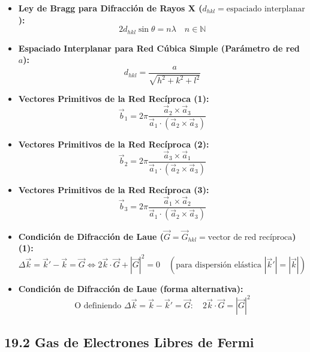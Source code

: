 \documentclass[11pt,a4paper]{article}
\begin{document}
\begin{itemize}
  \item \textbf{Ley de Bragg para Difracción de Rayos X ($d_{hkl} = \text{espaciado interplanar}$):}
  \[
    2 d_{hkl} \sin\theta = n \lambda \quad n \in \mathbb{N}
  \]
  \item \textbf{Espaciado Interplanar para Red Cúbica Simple (Parámetro de red $a$):}
  \[
    d_{hkl} = \frac{a}{\sqrt{h^2 + k^2 + l^2}}
  \]
  \item \textbf{Vectores Primitivos de la Red Recíproca (1):}
  \[
    \vec{b}_1 = 2\pi \frac{\vec{a}_2 \times \vec{a}_3}{\vec{a}_1 \cdot (\vec{a}_2 \times \vec{a}_3)}
  \]
  \item \textbf{Vectores Primitivos de la Red Recíproca (2):}
  \[
    \vec{b}_2 = 2\pi \frac{\vec{a}_3 \times \vec{a}_1}{\vec{a}_1 \cdot (\vec{a}_2 \times \vec{a}_3)}
  \]
  \item \textbf{Vectores Primitivos de la Red Recíproca (3):}
  \[
    \vec{b}_3 = 2\pi \frac{\vec{a}_1 \times \vec{a}_2}{\vec{a}_1 \cdot (\vec{a}_2 \times \vec{a}_3)}
  \]
  \item \textbf{Condición de Difracción de Laue ($\vec{G} = \vec{G}_{hkl} = \text{vector de red recíproca}$) (1):}
  \[
    \Delta\vec{k} = \vec{k}' - \vec{k} = \vec{G} \iff 2\vec{k} \cdot \vec{G} + |\vec{G}|^2 = 0 \quad (\text{para dispersión elástica } |\vec{k}'| = |\vec{k}|)
  \]
  \item \textbf{Condición de Difracción de Laue (forma alternativa):}
  \[
    \text{O definiendo } \Delta\vec{k} = \vec{k} - \vec{k}' = \vec{G}: \quad 2\vec{k} \cdot \vec{G} = |\vec{G}|^2
  \]
\end{itemize}

\subsection*{19.2 Gas de Electrones Libres de Fermi}
\end{document}

